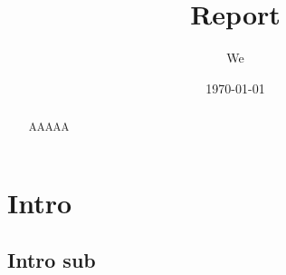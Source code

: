 \documentclass[10pt]{article}
\title{Report}
\date{\today}
\author{We}
\begin{document}
	\maketitle

	\begin{abstract}

		AAAAA
		
	\end{abstract}

	\section{Intro}

	\subsection{Intro sub}
\end{document}
